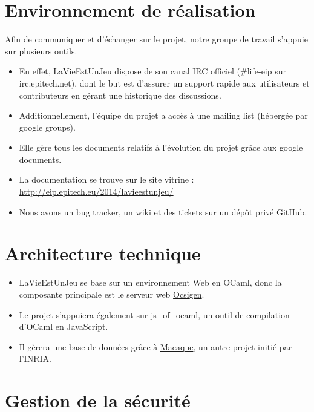 \documentclass{life-fr}
\begin{document}
\section{Environnement de réalisation}

Afin de communiquer et d’échanger sur le projet, notre groupe de travail s’appuie sur plusieurs outils.

\begin{itemize}
  \item En effet, LaVieEstUnJeu dispose de son canal IRC officiel (\#life-eip sur irc.epitech.net), dont le but est d’assurer un support rapide aux utilisateurs et contributeurs en gérant une historique des discussions.
  \item Additionnellement, l’équipe du projet a accès à une mailing list (hébergée par google groups).
  \item Elle gère tous les documents relatifs à l’évolution du projet grâce aux google documents.
  \item La documentation se trouve sur le site vitrine : \url{http://eip.epitech.eu/2014/lavieestunjeu/}
  \item Nous avons un bug tracker, un wiki et des tickets sur un dépôt privé GitHub.
\end{itemize}

\section{Architecture technique}

\begin{itemize}
  \item LaVieEstUnJeu se base sur un environnement Web en OCaml, donc la composante principale est le serveur web \href{http://ocsigen.org/}{Ocsigen}.
  \item Le projet s’appuiera également sur \href{http://ocsigen.org/js_of_ocaml/}{js\_of\_ocaml}, un outil de compilation d’OCaml en JavaScript.
  \item Il gèrera une base de données grâce à \href{http://ocsigen.org/macaque/}{Macaque}, un autre projet initié par l’INRIA.
\end{itemize}

\section{Gestion de la sécurité}
\end{document}

